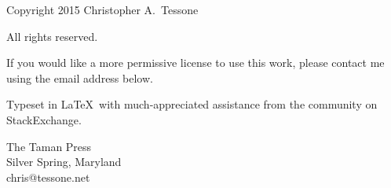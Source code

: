 \begingroup 
\footnotesize 
\parindent 0pt 
\parskip \baselineskip 
Copyright \textcopyright{} 2015 Christopher A.~Tessone

All rights reserved.



If you would like a more permissive license to use this work, please
contact me using the email address below.

Typeset in \LaTeX\ with much-appreciated assistance from the
community on StackExchange. %


\vfill 

The Taman Press\\
Silver Spring, Maryland\\
chris@tessone.net

\endgroup 
\pagestyle{empty}
\clearpage 
